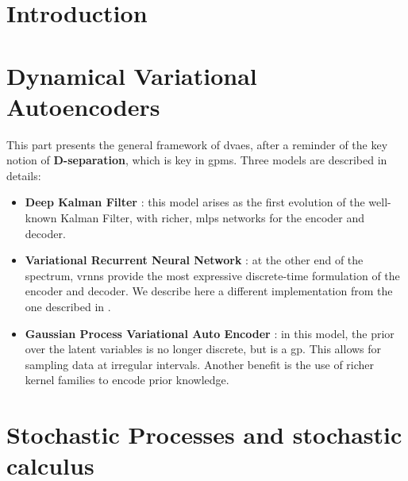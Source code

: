 \documentclass[twoside,11pt]{report}
\begin{document}
\part{Introduction}
    
    
    
    

\part{Dynamical Variational Autoencoders}

This part presents the general framework of \glspl{dvae}, after a reminder of the key notion of \textbf{D-separation}, which is key in \glspl{gpm}.
Three models are described in details:
\begin{itemize}
    \item \textbf{Deep Kalman Filter} : this model arises as the first evolution of the well-known Kalman Filter, with richer, \glspl{mlp} networks for the encoder and decoder.
    \item \textbf{Variational Recurrent Neural Network} : at the other end of the spectrum, \glspl{vrnn} provide the most expressive discrete-time formulation of the encoder and decoder.
We describe here a different implementation from the one described in \cite{girin_dynamical_2022}.
    \item \textbf{Gaussian Process Variational Auto Encoder} : in this model, the prior over the latent variables is no longer discrete, but is a \gls{gp}.
This allows for sampling data at irregular intervals. Another benefit is the use of richer kernel families to encode prior knowledge.
\end{itemize}

    
    
    
    
    

\part{Stochastic Processes and stochastic calculus}

    
    
    
    
    
\end{document}
